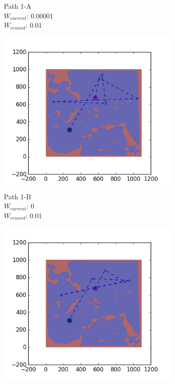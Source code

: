 \documentclass{tamuccthesis}
\begin{document}
\begin{figure}
\begin{subfigure}[b]{0.24\textwidth}
        \caption{{\small Path 1-A \\ $W_{current}$: 0.00001 \\ $W_{reward}$: 0.01}}
        \label{fig:Path_1-A_upReward_Work}
    \end{subfigure}
    \begin{subfigure}[b]{0.24\textwidth}
        \centering
        \includegraphics[width=\textwidth,trim={4cm 3cm 2cm 3cm},clip]{EXP3RG_PathAb_-1_-1_0_0d01.png}
        \caption{{\small Path 1-B \\ $W_{current}$: 0 \\ $W_{reward}$: 0.01}}
        \label{fig:Path_1-B_upReward_noWork}
    \end{subfigure}
    \begin{subfigure}[b]{0.24\textwidth}  
        \centering 
        \includegraphics[width=\textwidth,trim={4cm 3cm 2cm 3cm},clip]{EXP3RG_PathAb_-1_-1_-1_0d01.png}

\end{subfigure}
\end{figure}
\end{document}
